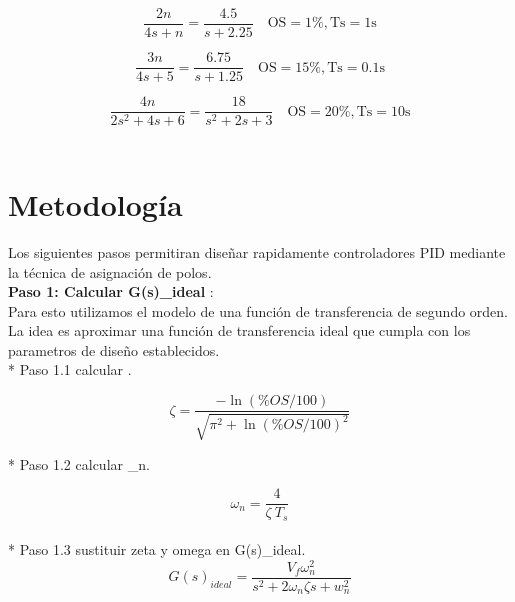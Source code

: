 \documentclass[12pt,letterpaper]{article}
\begin{document}
\begin{equation}\frac{2n}{4s+n} = \frac{4.5}{s+2.25} \quad \mathrm{OS}=1 \%, \mathrm{Ts}=1 \mathrm{s}\end{equation} 

\begin{equation}\frac{3n}{4s+5} = \frac{6.75}{s+1.25} \quad \mathrm{OS}=15 \%, \mathrm{Ts}=0.1 \mathrm{s}\end{equation} 

\begin{equation}\frac{4n}{2s^{2}+4s+6} = \frac{18}{s^{2}+2s+3} \quad \mathrm{OS}=20 \%, \mathrm{Ts}=10 \mathrm{s}\end{equation} \\ 


\section{Metodología}
\setcounter{equation}{0} %

Los siguientes pasos permitiran diseñar rapidamente controladores PID mediante la técnica de asignación de polos. \\ 

\textbf{Paso 1: Calcular G(s)_{ideal} }: \\ 

Para esto utilizamos el modelo de una función de transferencia de segundo orden. La idea es aproximar una función de transferencia ideal que cumpla con los parametros de diseño establecidos.  \\ 

* Paso 1.1 calcular \zeta.

\begin{equation}\zeta=\frac{- \ln(\%OS / 100)}{\sqrt{\pi^{2}+\ln(\%OS / 100)^{2}}}\end{equation} 

* Paso 1.2 calcular \omega_{n}. 

\begin{equation}\omega_{n}=\frac{4}{\zeta \ T_{s}}\end{equation}  \\

* Paso 1.3 sustituir zeta y omega en G(s)_{ideal}. \\ 

\begin{equation}G(s)_{ideal}=\frac{V_{f} \omega_{n}^{2}}{s^{2}+2 \omega_{n}\zeta s+w_{n}^{2}}\end{equation} \\ 
\end{document}
